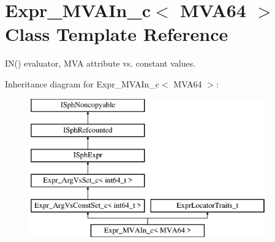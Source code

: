 \hypertarget{classExpr__MVAIn__c}{\section{Expr\-\_\-\-M\-V\-A\-In\-\_\-c$<$ M\-V\-A64 $>$ Class Template Reference}
\label{classExpr__MVAIn__c}
}


I\-N() evaluator, M\-V\-A attribute vs. constant values.  


Inheritance diagram for Expr\-\_\-\-M\-V\-A\-In\-\_\-c$<$ M\-V\-A64 $>$\-:\begin{figure}[H]
\begin{center}
\leavevmode
\includegraphics[height=6.000000cm]{classExpr__MVAIn__c}
\end{center}
\end{figure}
